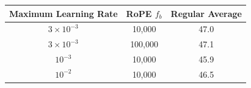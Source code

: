 \centering
    \resizebox{0.99\linewidth}{!}
    {
    \begin{tabular}{cc|c}
    \toprule[1.5pt]
      {\bf Maximum Learning Rate} & {\bf RoPE $f_b$} &{\bf Regular Average}\\
      \toprule[1pt]
      $3\times 10^{-3}$& 10,000& 47.0\\
      $3\times 10^{-3}$& 100,000& 47.1\\
  $10^{-3}$& 10,000& 45.9\\
      $10^{-2}$& 10,000& 46.5\\
        \bottomrule[1pt]
    \end{tabular}
        }